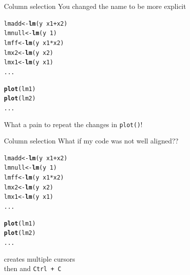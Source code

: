 \documentclass[10pt]{beamer}\usepackage[]{graphicx}\usepackage[]{color}
\makeatletter
\newcommand{\hlnum}[1]{\textcolor[rgb]{0.686,0.059,0.569}{#1}}%
\newcommand{\hlopt}[1]{\textcolor[rgb]{0,0,0}{#1}}%
\newcommand{\hlstd}[1]{\textcolor[rgb]{0.345,0.345,0.345}{#1}}%
\newcommand{\hlkwb}[1]{\textcolor[rgb]{0.69,0.353,0.396}{#1}}%
\newcommand{\hlkwd}[1]{\textcolor[rgb]{0.737,0.353,0.396}{\textbf{#1}}}%
\newenvironment{kframe}{%
 \def\at@end@of@kframe{}%
 \ifinner\ifhmode%
  \def\at@end@of@kframe{\end{minipage}}%
  \begin{minipage}{\columnwidth}%
 \fi\fi%
 \def\FrameCommand##1{\hskip\@totalleftmargin \hskip-\fboxsep
 \colorbox{shadecolor}{##1}\hskip-\fboxsep
     \hskip-\linewidth \hskip-\@totalleftmargin \hskip\columnwidth}%
 \MakeFramed {\advance\hsize-\width
   \@totalleftmargin\z@ \linewidth\hsize
   \@setminipage}}%
 {\par\unskip\endMakeFramed%
 \at@end@of@kframe}
\newenvironment{knitrout}{}{} %
\makeatother
\begin{document}
\begin{frame}[fragile]{Column selection}
You changed the name to be more explicit

\begin{knitrout}
\color{fgcolor}\begin{kframe}
\begin{alltt}
\hlstd{lmadd}  \hlkwb{<-} \hlkwd{lm}\hlstd{(y} \hlopt{~} \hlstd{x1} \hlopt{+} \hlstd{x2)}
\hlstd{lmnull} \hlkwb{<-} \hlkwd{lm}\hlstd{(y} \hlopt{~} \hlnum{1}\hlstd{)}
\hlstd{lmff}   \hlkwb{<-} \hlkwd{lm}\hlstd{(y} \hlopt{~} \hlstd{x1}\hlopt{*}\hlstd{x2)}
\hlstd{lmx2}   \hlkwb{<-} \hlkwd{lm}\hlstd{(y} \hlopt{~} \hlstd{x2)}
\hlstd{lmx1}   \hlkwb{<-} \hlkwd{lm}\hlstd{(y} \hlopt{~} \hlstd{x1)}
\hlstd{...}

\hlkwd{plot}\hlstd{(lm1)}
\hlkwd{plot}\hlstd{(lm2)}
\hlstd{...}
\end{alltt}
\end{kframe}
\end{knitrout}

What a pain to repeat the changes in \texttt{plot()}!
\pause

\end{frame}


\begin{frame}[fragile]{Column selection}
What if my code was not well aligned??

\begin{knitrout}
\color{fgcolor}\begin{kframe}
\begin{alltt}
\hlstd{lmadd} \hlkwb{<-} \hlkwd{lm}\hlstd{(y} \hlopt{~} \hlstd{x1} \hlopt{+} \hlstd{x2)}
\hlstd{lmnull} \hlkwb{<-} \hlkwd{lm}\hlstd{(y} \hlopt{~} \hlnum{1}\hlstd{)}
\hlstd{lmff} \hlkwb{<-} \hlkwd{lm}\hlstd{(y} \hlopt{~} \hlstd{x1}\hlopt{*}\hlstd{x2)}
\hlstd{lmx2}\hlkwb{<-} \hlkwd{lm}\hlstd{(y} \hlopt{~} \hlstd{x2)}
\hlstd{lmx1}  \hlkwb{<-} \hlkwd{lm}\hlstd{(y} \hlopt{~} \hlstd{x1)}
\hlstd{...}

\hlkwd{plot}\hlstd{(lm1)}
\hlkwd{plot}\hlstd{(lm2)}
\hlstd{...}
\end{alltt}
\end{kframe}
\end{knitrout}

\pause

 creates multiple cursors\\

then  and \texttt{Ctrl + C}
\end{frame}
\end{document}
